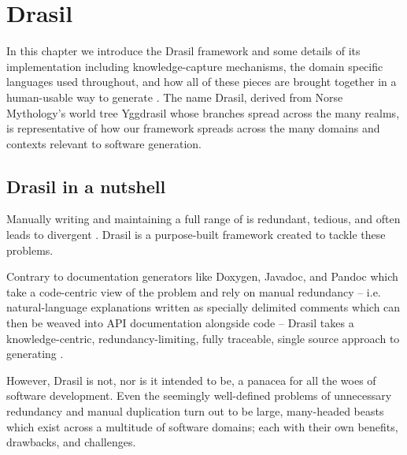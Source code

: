 \chapter{Drasil}
\label{c:drasil}


In this chapter we introduce the Drasil framework and some details of its 
implementation including knowledge-capture mechanisms, the domain specific 
languages used throughout, and how all of these pieces are brought together in 
a human-usable way to generate \sfs{}. The name Drasil, derived from Norse 
Mythology's world tree Yggdrasil whose branches spread across the 
many realms, is representative of how our framework spreads across the many 
domains and contexts relevant to software generation.
      
\section{Drasil in a nutshell}

Manually writing and maintaining a full range of \sfs{} is redundant, tedious, 
and often leads to divergent \sfs{}. Drasil is a purpose-built framework 
created to tackle these problems.

Contrary to documentation generators like Doxygen, Javadoc, and Pandoc
which take a code-centric view of the problem and rely on manual redundancy -- 
i.e. natural-language explanations written as specially delimited
comments which can then be weaved into API documentation alongside code -- 
Drasil takes a knowledge-centric, redundancy-limiting, fully traceable, single 
source approach to generating \sfs{}.

However, Drasil is not, nor is it intended to be, a panacea for all the woes of 
software development. Even the seemingly well-defined problems of unnecessary 
redundancy and manual duplication turn out to be large, many-headed beasts 
which exist across a multitude of software domains; each with their own 
benefits, drawbacks, and challenges.

